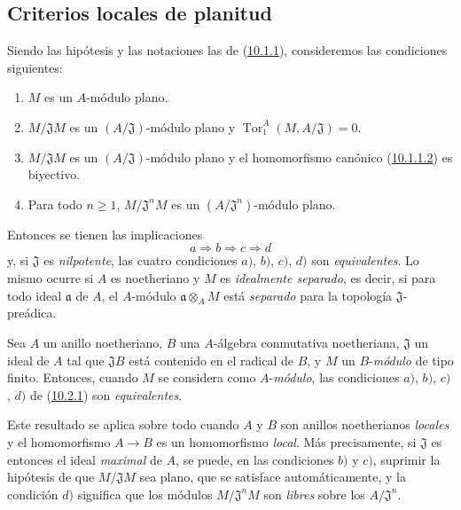 \subsection{Criterios locales de planitud}
\label{subsection:0.10.2}
\label{subsection:0.10.2-fr}

\begin{env}[10.2.1]
\label{0.10.2.1-fr}
Siendo las hipótesis y las notaciones las de (\hyperref[0.10.1.1-fr]{10.1.1}), consideremos las condiciones siguientes:
\begin{enumerate}
  \item[$a)$] $M$ es un $A$-módulo plano.
  \item[$b)$] $M/\mathfrak{J}M$ es un $(A/\mathfrak{J})$-módulo plano y $\operatorname{Tor}_1^A(M,A/\mathfrak{J})=0$.
  \item[$c)$] $M/\mathfrak{J}M$ es un $(A/\mathfrak{J})$-módulo plano y el homomorfismo canónico (\hyperref[0.10.1.1.2-fr]{10.1.1.2}) es biyectivo.
  \item[$d)$] Para todo $n\geq1$, $M/\mathfrak{J}^nM$ es un $(A/\mathfrak{J}^n)$-módulo plano.
\end{enumerate}

Entonces se tienen las implicaciones
\[
  a\Rightarrow b\Rightarrow c\Rightarrow d
\]
y, si $\mathfrak{J}$ es \emph{nilpotente}, las cuatro condiciones $a)$, $b)$, $c)$, $d)$ son \emph{equivalentes}. Lo mismo ocurre si $A$ es noetheriano y $M$ es \emph{idealmente separado}, es decir, si para todo ideal $\mathfrak{a}$ de $A$, el $A$-módulo $\mathfrak{a}\otimes_A M$ está \emph{separado} para la topología $\mathfrak{J}$-preádica.
\end{env}

\begin{env}[10.2.2]
\label{0.10.2.2}
\label{0.10.2.2-fr}
Sea $A$ un anillo noetheriano, $B$ una $A$-álgebra conmutativa noetheriana, $\mathfrak{J}$ un ideal de $A$ tal que $\mathfrak{J}B$ está contenido en el radical de $B$, y $M$ un $B$-\emph{módulo} de tipo finito.
Entonces, cuando $M$ se considera como $A$-\emph{módulo}, las condiciones $a)$, $b)$, $c)$, $d)$ de (\hyperref[0.10.2.1-fr]{10.2.1}) son \emph{equivalentes}.

Este resultado se aplica sobre todo cuando $A$ y $B$ son anillos noetherianos \emph{locales} y el homomorfismo $A\to B$ es un homomorfismo \emph{local}.
Más precisamente, si $\mathfrak{J}$ es entonces el ideal \emph{maximal} de $A$, se puede, en las condiciones $b)$ y $c)$, suprimir la hipótesis de que $M/\mathfrak{J}M$ sea plano, que se satisface automáticamente, y la condición $d)$ significa que los módulos $M/\mathfrak{J}^nM$ son \emph{libres} sobre los $A/\mathfrak{J}^n$.
\end{env}

